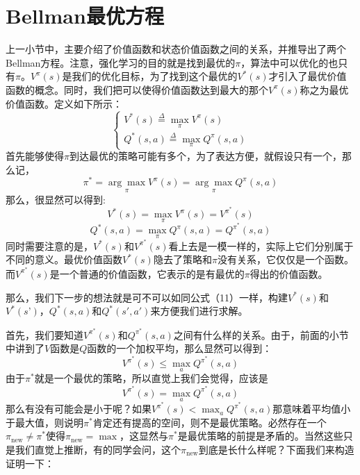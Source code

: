 \documentclass[a4paper]{article}
\begin{document}
\section{Bellman最优方程}
上一小节中，主要介绍了价值函数和状态价值函数之间的关系，并推导出了两个Bellman方程。注意，强化学习的目的就是找到最优的$\pi$，算法中可以优化的也只有$\pi$。$V^\pi(s)$是我们的优化目标，为了找到这个最优的$V^\ast(s)$才引入了最优价值函数的概念。同时，我们把可以使得价值函数达到最大的那个$V^\pi(s)$称之为最优价值函数。定义如下所示：
\begin{equation}\left\{\begin{array}{l}
V^{*}(s) \stackrel{\Delta}{=} \max_\pi V^{\pi}(s) \\
Q^{*}(s, a) \stackrel{\Delta}{=} \max_\pi Q^{\pi}(s, a)
\end{array}\right.\end{equation}
首先能够使得$\pi$到达最优的策略可能有多个，为了表达方便，就假设只有一个，那么记，
\begin{equation}
    \pi^\ast = \underset{\pi}{\arg\max} V^\pi(s) = \underset{\pi}{\arg\max} Q^\pi(s,a)
\end{equation}
那么，很显然可以得到:
\begin{equation}
    V^\ast(s) = \max_\pi V^\pi(s) = V^{\pi^\ast}(s)
\end{equation}
\begin{equation}
    Q^\ast(s,a) = \max_\pi Q^\pi(s,a) = Q^{\pi^\ast}(s,a)
\end{equation}
同时需要注意的是，$ V^\ast(s)$和$V^{\pi^\ast}(s)$看上去是一模一样的，实际上它们分别属于不同的意义。最优价值函数$V^\ast(s)$隐去了策略和$\pi$没有关系，它仅仅是一个函数。而$V^{\pi^\ast}(s)$是一个普通的价值函数，它表示的是有最优的$\pi$得出的价值函数。

那么，我们下一步的想法就是可不可以如同公式（11）一样，构建$V^\ast(s)$和$V^\ast(s’)$，$Q^\ast(s,a)$和$Q^\ast(s',a')$来方便我们进行求解。

首先，我们要知道$V^{\pi^\ast}(s)$和$Q^{\pi^\ast}(s,a)$之间有什么样的关系。由于，前面的小节中讲到了$V$函数是$Q$函数的一个加权平均，那么显然可以得到：
\begin{equation}
    V^{\pi^\ast}(s) \leq \max_a Q^{\pi^\ast}(s,a)
\end{equation}
由于$\pi^\ast$就是一个最优的策略，所以直觉上我们会觉得，应该是
\begin{equation}
    V^{\pi^\ast}(s) = \max_a Q^{\pi^\ast}(s,a)
\end{equation}
那么有没有可能会是小于呢？如果$V^{\pi^\ast}(s) < \max_a Q^{\pi^\ast}(s,a)$那意味着平均值小于最大值，则说明$\pi^\ast$肯定还有提高的空间，则不是最优策略。必然存在一个$\pi_{\text{new}} \neq \pi^\ast$使得$\pi_{\text{new}} =\max$，这显然与$\pi^\ast$是最优策略的前提是矛盾的。当然这些只是我们直觉上推断，有的同学会问，这个$\pi_{\text{new}}$到底是长什么样呢？下面我们来构造证明一下：
\end{document}
